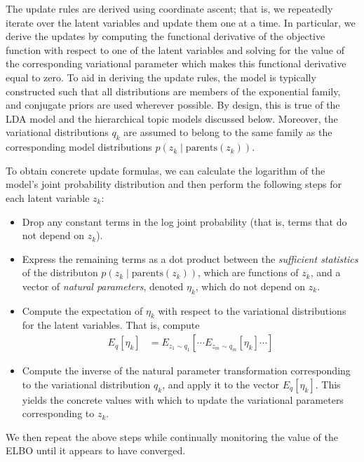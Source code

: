 \documentclass{article}
\begin{document}
The update rules are derived using coordinate ascent; that is, we repeatedly iterate over the latent variables and update them one at a time.
In particular, we derive the updates by computing the functional derivative of the objective function with respect to one of the latent variables and solving for the value of the corresponding variational parameter which makes this functional derivative equal to zero.
To aid in deriving the update rules, the model is typically constructed such that all distributions are members of the exponential family, and conjugate priors are used wherever possible.
By design, this is true of the LDA model and the hierarchical topic models discussed below.
Moreover, the variational distributions $q_k$ are assumed to belong to the same family as the corresponding model distributions $p(z_k \mid \text{parents}(z_k))$.

To obtain concrete update formulas, we can calculate the logarithm of the model's joint probability distribution and then perform the following steps for each latent variable $z_k$:
\begin{itemize}
\item Drop any constant terms in the log joint probability (that is, terms that do not depend on $z_k$).
\item Express the remaining terms as a dot product between the \emph{sufficient statistics} of the distributon $p(z_k \mid \text{parents}(z_k))$, which are functions of $z_k$, and a vector of \emph{natural parameters}, denoted $\eta_k$, which do not depend on $z_k$.
\item Compute the expectation of $\eta_k$ with respect to the variational distributions for the latent variables.
That is, compute
\begin{align}
E_q[\eta_k] &= E_{z_1 \sim q_1} \left[ \cdots E_{z_m \sim q_m} \left[ \eta_k \right] \cdots \right]
\end{align}
\item Compute the inverse of the natural parameter transformation corresponding to the variational distribution $q_k$, and apply it to the vector $E_q[\eta_k]$.
This yields the concrete values with which to update the variational parameters corresponding to $z_k$.
\end{itemize}
We then repeat the above steps while continually monitoring the value of the ELBO until it appears to have converged.
\end{document}
